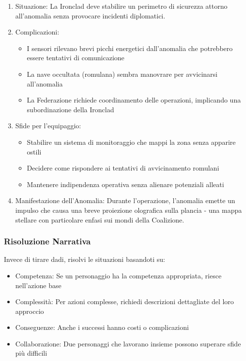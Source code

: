 \documentclass[letterpaper,twocolumn,openany,nodeprecatedcode]{dndbook}
\begin{document}
\begin{enumerate}
    \item Situazione: La Ironclad deve stabilire un perimetro di sicurezza attorno all'anomalia senza provocare incidenti diplomatici.
    \item Complicazioni:
    \begin{itemize}
    \item I sensori rilevano brevi picchi energetici dall'anomalia che potrebbero essere tentativi di comunicazione
    \item La nave occultata (romulana) sembra manovrare per avvicinarsi all'anomalia
    \item La Federazione richiede coordinamento delle operazioni, implicando una subordinazione della Ironclad
    
    \end{itemize}
    \item Sfide per l'equipaggio:
    \begin{itemize}
    \item Stabilire un sistema di monitoraggio che mappi la zona senza apparire ostili
    \item Decidere come rispondere ai tentativi di avvicinamento romulani
    \item Mantenere indipendenza operativa senza alienare potenziali alleati
    \end{itemize}
    
    \item Manifestazione dell'Anomalia: Durante l'operazione, l'anomalia emette un impulso che causa una breve proiezione olografica sulla plancia - una mappa stellare con particolare enfasi sui mondi della Coalizione.
\end{enumerate}

\subsubsection{Risoluzione Narrativa}
Invece di tirare dadi, risolvi le situazioni basandoti su:

\begin{itemize}
    \item Competenza: Se un personaggio ha la competenza appropriata, riesce nell'azione base
    \item Complessità: Per azioni complesse, richiedi descrizioni dettagliate del loro approccio
    \item Conseguenze: Anche i successi hanno costi o complicazioni
    \item Collaborazione: Due personaggi che lavorano insieme possono superare sfide più difficili
\end{itemize}
\end{document}
